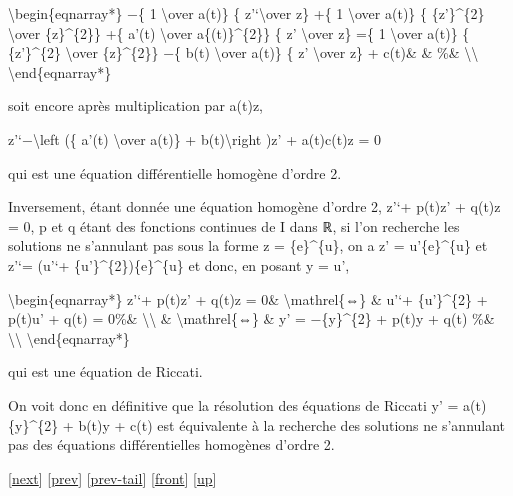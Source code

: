 \documentclass[]{article}
\begin{document}
\textbackslash{}begin\{eqnarray*\} −\{ 1 \textbackslash{}over a(t)\} \{
z'`\textbackslash{}over z\} +\{ 1 \textbackslash{}over a(t)\} \{
\{z'\}\^{}\{2\} \textbackslash{}over \{z\}\^{}\{2\}\} +\{ a'(t)
\textbackslash{}over a\{(t)\}\^{}\{2\}\} \{ z' \textbackslash{}over z\}
=\{ 1 \textbackslash{}over a(t)\} \{ \{z'\}\^{}\{2\}
\textbackslash{}over \{z\}\^{}\{2\}\} −\{ b(t) \textbackslash{}over
a(t)\} \{ z' \textbackslash{}over z\} + c(t)\& \& \%\&
\textbackslash{}\textbackslash{} \textbackslash{}end\{eqnarray*\}

soit encore après multiplication par a(t)z,

z'`−\textbackslash{}left (\{ a'(t) \textbackslash{}over a(t)\} +
b(t)\textbackslash{}right )z' + a(t)c(t)z = 0

qui est une équation différentielle homogène d'ordre 2.

Inversement, étant donnée une équation homogène d'ordre 2, z'`+ p(t)z' +
q(t)z = 0, p et q étant des fonctions continues de I dans ℝ, si l'on
recherche les solutions ne s'annulant pas sous la forme z =
\{e\}\^{}\{u\}, on a z' = u'\{e\}\^{}\{u\} et z'`= (u'`+
\{u'\}\^{}\{2\})\{e\}\^{}\{u\} et donc, en posant y = u',

\textbackslash{}begin\{eqnarray*\} z'`+ p(t)z' + q(t)z = 0\&
\textbackslash{}mathrel\{⇔\} \& u'`+ \{u'\}\^{}\{2\} + p(t)u' + q(t) =
0\%\& \textbackslash{}\textbackslash{} \& \textbackslash{}mathrel\{⇔\}
\& y' = −\{y\}\^{}\{2\} + p(t)y + q(t) \%\&
\textbackslash{}\textbackslash{} \textbackslash{}end\{eqnarray*\}

qui est une équation de Riccati.

On voit donc en définitive que la résolution des équations de Riccati y'
= a(t)\{y\}\^{}\{2\} + b(t)y + c(t) est équivalente à la recherche des
solutions ne s'annulant pas des équations différentielles homogènes
d'ordre 2.

{[}\href{coursse91.html}{next}{]} {[}\href{coursse89.html}{prev}{]}
{[}\href{coursse89.html\#tailcoursse89.html}{prev-tail}{]}
{[}\href{coursse90.html}{front}{]}
{[}\href{coursch17.html\#coursse90.html}{up}{]}
\end{document}
